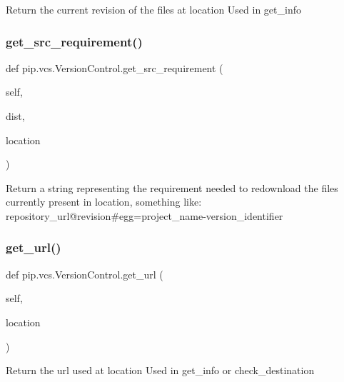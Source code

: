 \begin{DoxyVerb}Return the current revision of the files at location
Used in get_info
\end{DoxyVerb}
 \mbox{\label{classpip_1_1vcs_1_1_version_control_a64a95652b5a508334ef46084a02157b9}} 
\subsubsection{\texorpdfstring{get\+\_\+src\+\_\+requirement()}{get\_src\_requirement()}}
{\footnotesize\ttfamily def pip.\+vcs.\+Version\+Control.\+get\+\_\+src\+\_\+requirement (\begin{DoxyParamCaption}\item[{}]{self,  }\item[{}]{dist,  }\item[{}]{location }\end{DoxyParamCaption})}

\begin{DoxyVerb}Return a string representing the requirement needed to
redownload the files currently present in location, something
like:
  {repository_url}@{revision}#egg={project_name}-{version_identifier}
\end{DoxyVerb}
 \mbox{\label{classpip_1_1vcs_1_1_version_control_a3eed659ef15a7669b94b9c378b23fbdf}} 
\subsubsection{\texorpdfstring{get\+\_\+url()}{get\_url()}}
{\footnotesize\ttfamily def pip.\+vcs.\+Version\+Control.\+get\+\_\+url (\begin{DoxyParamCaption}\item[{}]{self,  }\item[{}]{location }\end{DoxyParamCaption})}

\begin{DoxyVerb}Return the url used at location
Used in get_info or check_destination
\end{DoxyVerb}
 \mbox{\label{classpip_1_1vcs_1_1_version_control_a365d5d1efc7c26df38667b921d33c650}} 
